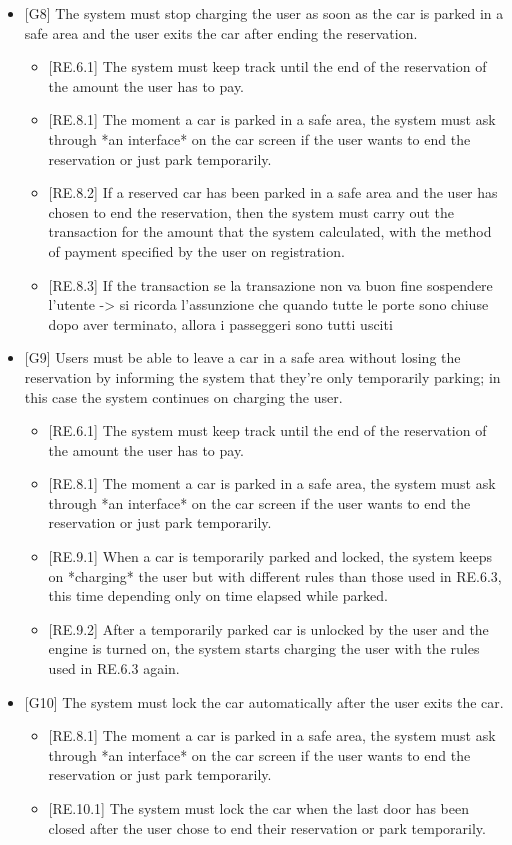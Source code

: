 \documentclass[english]{article}
\begin{document}
\begin{itemize}
\item{[G8] The system must stop charging the user as soon as the car is parked in a safe area and the user exits the car after ending the reservation.
\begin{itemize}
	\item{[RE.6.1] The system must keep track until the end of the reservation of the amount the user has to pay.}
	\item{[RE.8.1] The moment a car is parked in a safe area, the system must ask through *an interface* on the car screen if the user wants to end the reservation or just park temporarily.}
	\item{[RE.8.2] If a reserved car has been parked in a safe area and the user has chosen to end the reservation, then  the system must carry out the transaction for the amount that the system calculated, with the method of payment specified by the user on registration.}
	\item{[RE.8.3] If the transaction} se la transazione non va buon fine sospendere l'utente
-> si ricorda l’assunzione che quando tutte le porte sono chiuse dopo aver terminato, allora i passeggeri sono tutti usciti
\end{itemize}
}

\item{[G9] Users must be able to leave a car in a safe area without losing the reservation by informing the system that they’re only temporarily parking; in this case the system continues on charging the user.
\begin{itemize}
	\item{[RE.6.1] The system must keep track until the end of the reservation of the amount the user has to pay.}
	\item{[RE.8.1] The moment a car is parked in a safe area, the system must ask through *an interface* on the car screen if the user wants to end the reservation or just park temporarily.}
	\item{[RE.9.1] When a car is temporarily parked and locked, the system keeps on *charging* the user but with different rules than those used in RE.6.3, this time depending only on time elapsed while parked.}
	\item{[RE.9.2] After a temporarily parked car is unlocked by the user and the engine is turned on, the system starts charging the user with the rules used in RE.6.3 again.}
\end{itemize}
}

\item{[G10] The system must lock the car automatically after the user exits the car.
\begin{itemize}
	\item{[RE.8.1] The moment a car is parked in a safe area, the system must ask through *an interface* on the car screen if the user wants to end the reservation or just park temporarily.}
	\item{[RE.10.1] The system must lock the car when the last door has been closed after the user chose to end their reservation or park temporarily.}
\end{itemize}
}


\end{itemize}
\end{document}
